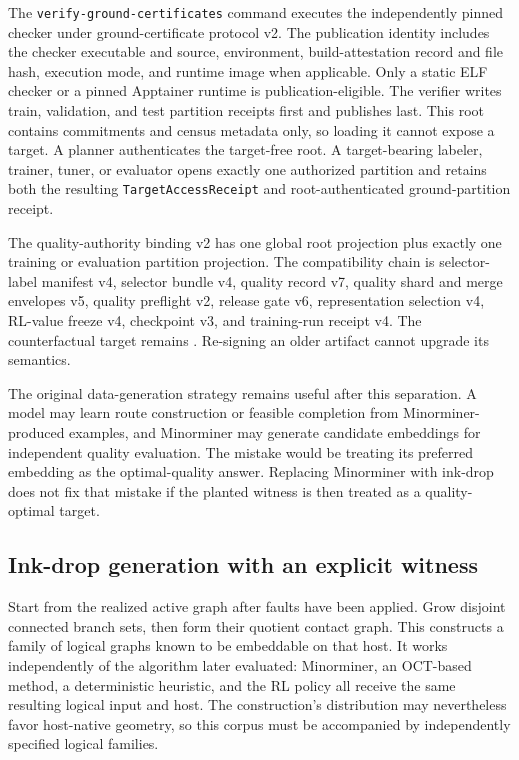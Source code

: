 The \texttt{verify-ground-certificates} command executes the independently pinned checker under ground-certificate protocol v2. The publication identity includes the checker executable and source, environment, build-attestation record and file hash, execution mode, and runtime image when applicable. Only a static ELF checker or a pinned Apptainer runtime is publication-eligible. The verifier writes train, validation, and test partition receipts first and publishes  last. This root contains commitments and census metadata only, so loading it cannot expose a target. A planner authenticates the target-free root. A target-bearing labeler, trainer, tuner, or evaluator opens exactly one authorized partition and retains both the resulting \texttt{TargetAccessReceipt} and root-authenticated ground-partition receipt.

The quality-authority binding v2 has one global root projection plus exactly one training or evaluation partition projection. The compatibility chain is selector-label manifest v4, selector bundle v4, quality record v7, quality shard and merge envelopes v5, quality preflight v2, release gate v6, representation selection v4, RL-value freeze v4, checkpoint v3, and training-run receipt v4. The counterfactual target remains . Re-signing an older artifact cannot upgrade its semantics.

The original data-generation strategy remains useful after this separation. A model may learn route construction or feasible completion from Minorminer-produced examples, and Minorminer may generate candidate embeddings for independent quality evaluation. The mistake would be treating its preferred embedding as the optimal-quality answer. Replacing Minorminer with ink-drop does not fix that mistake if the planted witness is then treated as a quality-optimal target.

\subsection{Ink-drop generation with an explicit witness}
\label{data:inkdrop}

Start from the realized active graph after faults have been applied. Grow disjoint connected branch sets, then form their quotient contact graph. This constructs a family of logical graphs known to be embeddable on that host. It works independently of the algorithm later evaluated: Minorminer, an OCT-based method, a deterministic heuristic, and the RL policy all receive the same resulting logical input and host. The construction's distribution may nevertheless favor host-native geometry, so this corpus must be accompanied by independently specified logical families.

